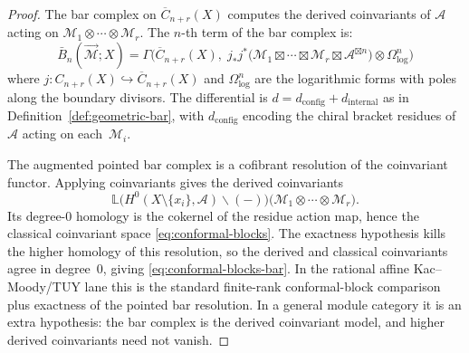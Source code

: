 \begin{proof}
The bar complex on $\overline{C}_{n+r}(X)$ computes the derived
coinvariants of $\mathcal{A}$ acting on
$\mathcal{M}_1 \otimes \cdots \otimes \mathcal{M}_r$. The
$n$-th term of the bar complex is:
\[
\bar{B}_n(\vec{\mathcal{M}}; X) = \Gamma\bigl(
\overline{C}_{n+r}(X),\;
j_*j^*\bigl(\mathcal{M}_1 \boxtimes \cdots \boxtimes
\mathcal{M}_r \boxtimes \mathcal{A}^{\boxtimes n}\bigr)
\otimes \Omega^n_{\log}
\bigr)
\]
where $j\colon C_{n+r}(X) \hookrightarrow \overline{C}_{n+r}(X)$
and $\Omega^n_{\log}$ are the logarithmic forms with poles along
the boundary divisors. The differential is
$d = d_{\mathrm{config}} + d_{\mathrm{internal}}$ as in
Definition~\ref{def:geometric-bar}, with $d_{\mathrm{config}}$
encoding the chiral bracket residues of $\mathcal{A}$ acting on
each~$\mathcal{M}_i$.

The augmented pointed bar complex is a cofibrant resolution of the
coinvariant functor. Applying coinvariants gives the derived
coinvariants
\[
\mathbb{L}\bigl(
H^0(X\setminus\{x_i\},\mathcal{A})\backslash(-)
\bigr)
\bigl(\mathcal{M}_1\otimes\cdots\otimes\mathcal{M}_r\bigr).
\]
Its degree-$0$ homology is the cokernel of the residue action
map, hence the classical coinvariant space
\eqref{eq:conformal-blocks}. The exactness hypothesis kills the
higher homology of this resolution, so the derived and classical
coinvariants agree in degree~$0$, giving
\eqref{eq:conformal-blocks-bar}. In the rational affine Kac--Moody/TUY
lane this is the standard finite-rank conformal-block comparison plus
exactness of the pointed bar resolution. In a general module category
it is an extra hypothesis: the bar complex is the derived coinvariant
model, and higher derived coinvariants need not vanish.
\end{proof}

